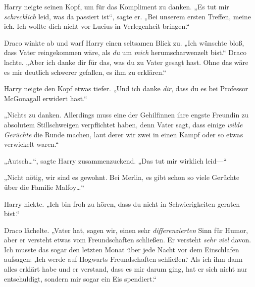 Harry neigte seinen Kopf, um für das Kompliment zu danken. „Es tut mir \emph{schrecklich} leid, was da passiert ist“, sagte er. „Bei unserem ersten Treffen, meine ich. Ich wollte dich nicht vor Lucius in Verlegenheit bringen.“

Draco winkte ab und warf Harry einen seltsamen Blick zu. „Ich wünschte bloß, dass Vater reingekommen wäre, als \emph{du} um \emph{mich} herumscharwenzelt bist.“ Draco lachte. „Aber ich danke dir für das, was du zu Vater gesagt hast. Ohne das wäre es mir deutlich schwerer gefallen, es ihm zu erklären.“

Harry neigte den Kopf etwas tiefer. „Und ich danke \emph{dir}, dass du es bei Professor McGonagall erwidert hast.“

„Nichts zu danken. Allerdings muss eine der Gehilfinnen ihre engste Freundin zu absolutem Stillschweigen verpflichtet haben, denn Vater sagt, dass einige \emph{wilde Gerüchte} die Runde machen, laut derer wir zwei in einen Kampf oder so etwas verwickelt waren.“

„Autsch…“, sagte Harry zusammenzuckend. „Das tut mir wirklich leid—“

„Nicht nötig, wir sind es gewohnt. Bei Merlin, es gibt schon so viele Gerüchte über die Familie Malfoy…“

Harry nickte. „Ich bin froh zu hören, dass du nicht in Schwierigkeiten geraten bist.“

Draco lächelte. „Vater hat, sagen wir, einen sehr \emph{differenzierten} Sinn für Humor, aber er versteht etwas vom Freundschaften schließen. Er versteht \emph{sehr viel} davon. Ich musste das sogar den letzten Monat über jede Nacht vor dem Einschlafen aufsagen: ‚Ich werde auf Hogwarts Freundschaften schließen.‘ Als ich ihm dann alles erklärt habe und er verstand, dass es mir darum ging, hat er sich nicht nur entschuldigt, sondern mir sogar ein Eis spendiert.“

